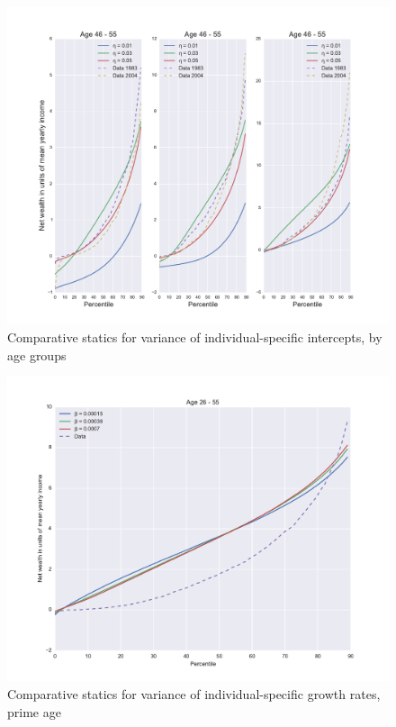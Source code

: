 \begin{figure}
\includegraphics[width=\columnwidth]{comp_stat_eta_agedetail}
\caption{Comparative statics for variance of individual-specific intercepts, by age groups}
\label{fig:comp_stat_eta_agedetail}
\end{figure}

\begin{figure}
\includegraphics[width=\columnwidth]{comp_stat_beta}
\caption{Comparative statics for variance of individual-specific growth rates, prime age}
\label{fig:comp_stat_beta}
\end{figure}


